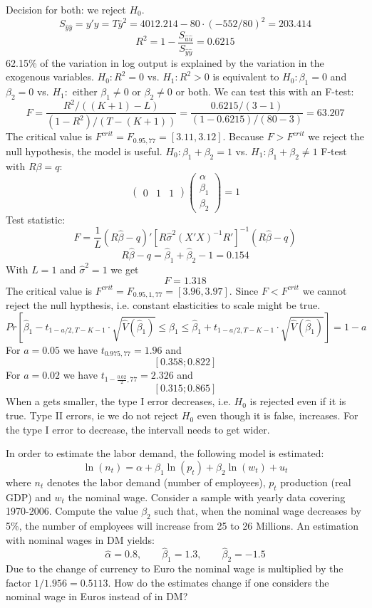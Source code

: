 \documentclass{article}
\begin{document}
\begin{Answer}
Decision for both: we reject $H_0$.
\Question
$$S_{\hat{y}\hat{y}} = y'y = T\bar{y}^2 = 4012.214 - 80\cdot(-552/80)^2 = 203.414$$
$$R^2 = 1- \frac{S_{\hat{u}\hat{u}}}{S_{\hat{y}\hat{y}}}=0.6215$$
62.15\% of the variation in log output is explained by the variation in the exogenous variables.
\Question
$H_0:R^2=0$ vs. $H_1:R^2>0$ is equivalent to $H_0:\beta_1=0$ and $\beta_2=0$ vs. $H_1:$ either $\beta_1\neq0$ or $\beta_2\neq0$ or both.
We can test this with an F-test:
$$F = \frac{R^2/((K+1)-L)}{(1-R^2)/(T-(K+1))} = \frac{0.6215/(3-1)}{(1-0.6215)/(80-3)} = 63.207$$
The critical value is $F^{crit} = F_{0.95,77}=[3.11,3.12]$.
Because $F>F^{crit}$ we reject the null hypothesis, the model is useful.
\Question
$H_0:\beta_1+\beta_2 = 1$ vs. $H_1:\beta_1+\beta_2\neq 1$
F-test with $R\beta=q$:
$$\begin{pmatrix}0 & 1 & 1\end{pmatrix}\begin{pmatrix} \alpha \\ \beta_1 \\ \beta_2 \end{pmatrix} = 1$$
Test statistic:
$$F = \frac{1}{L} (R\hat{\beta}-q)'\left[R\hat{\sigma}^2(X'X)^{-1}R'\right]^{-1}(R\hat{\beta}-q)$$
$$R\hat{\beta}-q = \hat{\beta}_1+\hat{\beta}_2-1=0.154$$
With $L=1$ and $\hat{\sigma}^2=1$ we get $$F=1.318$$
The critical value is $F^{crit}=F_{0.95,1,77}=[3.96,3.97]$. Since $F<F^{crit}$ we cannot reject the null hypthesis, i.e. constant elasticities to scale might be true.
\Question
$$Pr\left[\hat{\beta}_1 - t_{1-a/2,T-K-1}\cdot \sqrt{\hat{V}(\hat{\beta}_1)} \leq \beta_1 \leq \hat{\beta}_1 + t_{1-a/2,T-K-1}\cdot \sqrt{\hat{V}(\hat{\beta}_1)} \right]=1-a$$
For $a=0.05$ we have $t_{0.975,77}=1.96$ and
$$\left[0.358;0.822\right]$$
For $a=0.02$ we have $t_{1-\frac{0.02}{2},77}=2.326$ and
$$\left[0.315;0.865\right]$$
When a gets smaller, the type I error decreases, i.e. $H_0$ is rejected even if it is true. Type II errors, ie we do not reject $H_0$ even though it is false, increases.
For the type I error to decrease, the intervall needs to get wider.
\end{Answer}
\newpage

\begin{Exercise}[title=(Labor Demand)]
In order to estimate the labor demand, the following model is estimated:
$$ \ln(n_t) = \alpha + \beta_1 \ln(p_t) + \beta_2 \ln(w_t) + u_t$$
where $n_t$ denotes the labor demand (number of employees), $p_t$ production (real GDP) and $w_t$ the nominal wage. Consider a sample with yearly data covering 1970-2006.
\Question Compute the value $\beta_2$ such that, when the nominal wage decreases by 5\%, the number of employees will increase from 25 to 26 Millions.
\Question An estimation with nominal wages in DM yields: 
	$$\hat{\alpha} = 0.8, \qquad \hat{\beta}_1 = 1.3, \qquad \hat{\beta}_2 = -1.5$$
	Due to the change of currency to Euro the nominal wage is multiplied by the factor $1/1.956=0.5113$. How do the estimates change if one considers the nominal wage in Euros instead of in DM?
\end{Exercise}
\end{document}
